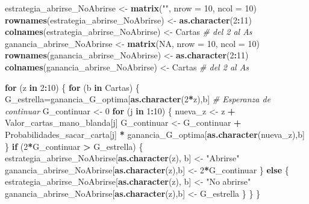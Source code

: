 \documentclass[12pt,a4paper,]{book}
\newenvironment{Shaded}{\begin{snugshade}}{\end{snugshade}}
\newcommand{\AttributeTok}[1]{\textcolor[rgb]{0.13,0.29,0.53}{#1}}
\newcommand{\CommentTok}[1]{\textcolor[rgb]{0.56,0.35,0.01}{\textit{#1}}}
\newcommand{\ConstantTok}[1]{\textcolor[rgb]{0.56,0.35,0.01}{#1}}
\newcommand{\ControlFlowTok}[1]{\textcolor[rgb]{0.13,0.29,0.53}{\textbf{#1}}}
\newcommand{\DecValTok}[1]{\textcolor[rgb]{0.00,0.00,0.81}{#1}}
\newcommand{\FunctionTok}[1]{\textcolor[rgb]{0.13,0.29,0.53}{\textbf{#1}}}
\newcommand{\NormalTok}[1]{#1}
\newcommand{\OtherTok}[1]{\textcolor[rgb]{0.56,0.35,0.01}{#1}}
\newcommand{\SpecialCharTok}[1]{\textcolor[rgb]{0.81,0.36,0.00}{\textbf{#1}}}
\newcommand{\StringTok}[1]{\textcolor[rgb]{0.31,0.60,0.02}{#1}}
\numberwithin{dummy}{section}
\theoremstyle{ocrenumbox}
\theoremstyle{blacknumex}
\theoremstyle{blacknumbox}
\theoremstyle{ocrenum}
\theoremstyle{ocrenum}
\begin{document}
\begin{Shaded}
\begin{Highlighting}[]
\NormalTok{estrategia\_abrirse\_NoAbrirse }\OtherTok{\textless{}{-}} \FunctionTok{matrix}\NormalTok{(}\StringTok{""}\NormalTok{, }\AttributeTok{nrow =} \DecValTok{10}\NormalTok{, }\AttributeTok{ncol =} \DecValTok{10}\NormalTok{)}
\FunctionTok{rownames}\NormalTok{(estrategia\_abrirse\_NoAbrirse) }\OtherTok{\textless{}{-}} \FunctionTok{as.character}\NormalTok{(}\DecValTok{2}\SpecialCharTok{:}\DecValTok{11}\NormalTok{)}
\FunctionTok{colnames}\NormalTok{(estrategia\_abrirse\_NoAbrirse) }\OtherTok{\textless{}{-}}\NormalTok{ Cartas  }\CommentTok{\# del 2 al As}
\NormalTok{ganancia\_abrirse\_NoAbrirse }\OtherTok{\textless{}{-}} \FunctionTok{matrix}\NormalTok{(}\ConstantTok{NA}\NormalTok{, }\AttributeTok{nrow =} \DecValTok{10}\NormalTok{, }\AttributeTok{ncol =} \DecValTok{10}\NormalTok{)}
\FunctionTok{rownames}\NormalTok{(ganancia\_abrirse\_NoAbrirse) }\OtherTok{\textless{}{-}} \FunctionTok{as.character}\NormalTok{(}\DecValTok{2}\SpecialCharTok{:}\DecValTok{11}\NormalTok{)}
\FunctionTok{colnames}\NormalTok{(ganancia\_abrirse\_NoAbrirse) }\OtherTok{\textless{}{-}}\NormalTok{ Cartas  }\CommentTok{\# del 2 al As}

\ControlFlowTok{for}\NormalTok{ (z }\ControlFlowTok{in} \DecValTok{2}\SpecialCharTok{:}\DecValTok{10}\NormalTok{) \{}
  \ControlFlowTok{for}\NormalTok{ (b }\ControlFlowTok{in}\NormalTok{ Cartas) \{}
\NormalTok{    G\_estrella}\OtherTok{=}\NormalTok{ganancia\_G\_optima[}\FunctionTok{as.character}\NormalTok{(}\DecValTok{2}\SpecialCharTok{*}\NormalTok{z),b]}
    \CommentTok{\# Esperanza de continuar}
\NormalTok{    G\_continuar }\OtherTok{\textless{}{-}} \DecValTok{0}
    \ControlFlowTok{for}\NormalTok{ (j }\ControlFlowTok{in} \DecValTok{1}\SpecialCharTok{:}\DecValTok{10}\NormalTok{) \{}
\NormalTok{      nueva\_z }\OtherTok{\textless{}{-}}\NormalTok{ z }\SpecialCharTok{+}\NormalTok{ Valor\_cartas\_mano\_blanda[j]}
\NormalTok{      G\_continuar }\OtherTok{\textless{}{-}}\NormalTok{ G\_continuar }\SpecialCharTok{+}\NormalTok{ Probabilidades\_sacar\_carta[j] }\SpecialCharTok{*}\NormalTok{ ganancia\_G\_optima[}\FunctionTok{as.character}\NormalTok{(nueva\_z),b] }
\NormalTok{    \}}
    \ControlFlowTok{if}\NormalTok{ (}\DecValTok{2}\SpecialCharTok{*}\NormalTok{G\_continuar }\SpecialCharTok{\textgreater{}}\NormalTok{ G\_estrella) \{}
\NormalTok{      estrategia\_abrirse\_NoAbrirse[}\FunctionTok{as.character}\NormalTok{(z), b] }\OtherTok{\textless{}{-}} \StringTok{"Abrirse"}
\NormalTok{      ganancia\_abrirse\_NoAbrirse[}\FunctionTok{as.character}\NormalTok{(z),b] }\OtherTok{\textless{}{-}} \DecValTok{2}\SpecialCharTok{*}\NormalTok{G\_continuar}
\NormalTok{    \} }\ControlFlowTok{else}\NormalTok{ \{}
\NormalTok{      estrategia\_abrirse\_NoAbrirse[}\FunctionTok{as.character}\NormalTok{(z), b] }\OtherTok{\textless{}{-}} \StringTok{"No abrirse"}
\NormalTok{      ganancia\_abrirse\_NoAbrirse[}\FunctionTok{as.character}\NormalTok{(z),b] }\OtherTok{\textless{}{-}}\NormalTok{ G\_estrella}
\NormalTok{    \}}
\NormalTok{  \}}
\NormalTok{\}}


\end{Highlighting}
\end{Shaded}
\end{document}
